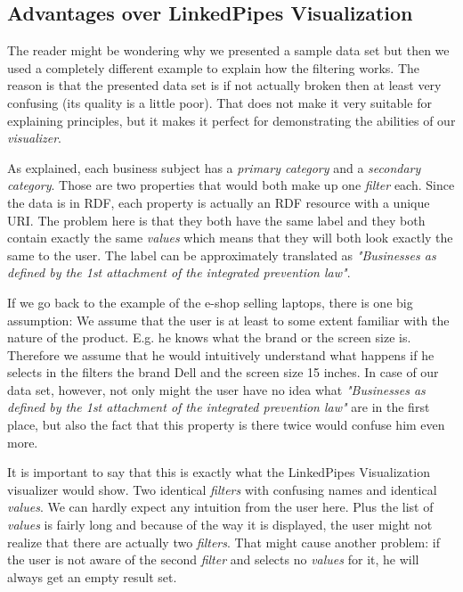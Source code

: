 
\subsection{Advantages over LinkedPipes Visualization}

The reader might be wondering why we presented a sample data set but then we used a completely different example to explain how the filtering works. The reason is that the presented data set is if not actually broken then at least very confusing (its quality is a little poor). That does not make it very suitable for explaining principles, but it makes it perfect for demonstrating the abilities of our \emph{visualizer}.

As explained, each business subject has a \emph{primary category} and a \emph{secondary category}. Those are two properties that would both make up one \emph{filter} each. Since the data is in RDF, each property is actually an RDF resource with a unique URI. The problem here is that they both have the same label and they both contain exactly the same \emph{values} which means that they will both look exactly the same to the user. The label can be approximately translated as \textit{"Businesses as defined by the 1st attachment of the integrated prevention law"}.

If we go back to the example of the e-shop selling laptops, there is one big assumption: We assume that the user is at least to some extent familiar with the nature of the product. E.g. he knows what the brand or the screen size is. Therefore we assume that he would intuitively understand what happens if he selects in the filters the brand Dell and the screen size 15 inches. In case of our data set, however, not only might the user have no idea what \textit{"Businesses as defined by the 1st attachment of the integrated prevention law"} are in the first place, but also the fact that this property is there twice would confuse him even more. 

It is important to say that this is exactly what the LinkedPipes Visualization visualizer would show. Two identical \emph{filters} with confusing names and identical \emph{values}. We can hardly expect any intuition from the user here. Plus the list of \emph{values} is fairly long and because of the way it is displayed, the user might not realize that there are actually two \emph{filters}. That might cause another problem: if the user is not aware of the second \emph{filter} and selects no \emph{values} for it, he will always get an empty result set.


